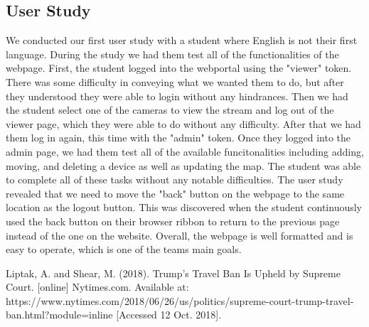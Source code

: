 \documentclass[onecolumn, draftclsnofoot,10pt, compsoc]{IEEEtran}
\begin{document}
    \subsection{User Study}
    We conducted our first user study with a student where English is not their first language.
    During the study we had them test all of the functionalities of the webpage.
    First, the student logged into the webportal using the "viewer" token.
    There was some difficulty in conveying what we wanted them to do, but after they understood they were able to login without any hindrances.
    Then we had the student select one of the cameras to view the stream and log out of the viewer page, which they were able to do without any difficulty.
    After that we had them log in again, this time with the "admin" token.
    Once they logged into the admin page, we had them test all of the available funcitonalities including adding, moving, and deleting a device as well as updating the map.
    The student was able to complete all of these tasks without any notable difficulties.
    The user study revealed that we need to move the "back" button on the webpage to the same location as the logout button. 
    This was discovered when the student continuously used the back button on their browser ribbon to return to the previous page instead of the one on the website.
    Overall, the webpage is well formatted and is easy to operate, which is one of the teams main goals.

\begin{thebibliography}{1}

 Liptak, A. and Shear, M. (2018). Trump’s Travel Ban Is Upheld by Supreme Court. [online] Nytimes.com. Available at: https://www.nytimes.com/2018/06/26/us/politics/supreme-court-trump-travel-ban.html?module=inline [Accessed 12 Oct. 2018].

\end{thebibliography}
\end{document}

